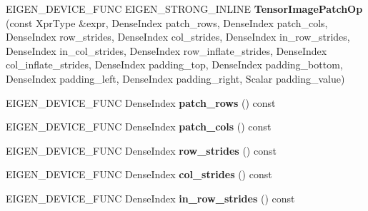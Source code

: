 \begin{DoxyCompactItemize}
\mbox{\label{class_eigen_1_1_tensor_image_patch_op_a34698ee6c72b81ae6d6f7aa7fc346c76}} 
E\+I\+G\+E\+N\+\_\+\+D\+E\+V\+I\+C\+E\+\_\+\+F\+U\+NC E\+I\+G\+E\+N\+\_\+\+S\+T\+R\+O\+N\+G\+\_\+\+I\+N\+L\+I\+NE {\bfseries Tensor\+Image\+Patch\+Op} (const Xpr\+Type \&expr, Dense\+Index patch\+\_\+rows, Dense\+Index patch\+\_\+cols, Dense\+Index row\+\_\+strides, Dense\+Index col\+\_\+strides, Dense\+Index in\+\_\+row\+\_\+strides, Dense\+Index in\+\_\+col\+\_\+strides, Dense\+Index row\+\_\+inflate\+\_\+strides, Dense\+Index col\+\_\+inflate\+\_\+strides, Dense\+Index padding\+\_\+top, Dense\+Index padding\+\_\+bottom, Dense\+Index padding\+\_\+left, Dense\+Index padding\+\_\+right, Scalar padding\+\_\+value)
\item 
\mbox{\label{class_eigen_1_1_tensor_image_patch_op_a1c91c64f0645c45a1ff9c3b4253fa1c2}} 
E\+I\+G\+E\+N\+\_\+\+D\+E\+V\+I\+C\+E\+\_\+\+F\+U\+NC Dense\+Index {\bfseries patch\+\_\+rows} () const
\item 
\mbox{\label{class_eigen_1_1_tensor_image_patch_op_a3a27f33569e00df968a5e4b36f51b57a}} 
E\+I\+G\+E\+N\+\_\+\+D\+E\+V\+I\+C\+E\+\_\+\+F\+U\+NC Dense\+Index {\bfseries patch\+\_\+cols} () const
\item 
\mbox{\label{class_eigen_1_1_tensor_image_patch_op_a802546a8dae43a44aa924bfc11e52eae}} 
E\+I\+G\+E\+N\+\_\+\+D\+E\+V\+I\+C\+E\+\_\+\+F\+U\+NC Dense\+Index {\bfseries row\+\_\+strides} () const
\item 
\mbox{\label{class_eigen_1_1_tensor_image_patch_op_a303f255d460937a50f6a62fe25df980a}} 
E\+I\+G\+E\+N\+\_\+\+D\+E\+V\+I\+C\+E\+\_\+\+F\+U\+NC Dense\+Index {\bfseries col\+\_\+strides} () const
\item 
\mbox{\label{class_eigen_1_1_tensor_image_patch_op_a1d4af257f268bf707e5726c565e5f54f}} 
E\+I\+G\+E\+N\+\_\+\+D\+E\+V\+I\+C\+E\+\_\+\+F\+U\+NC Dense\+Index {\bfseries in\+\_\+row\+\_\+strides} () const
\item 
\mbox{\label{class_eigen_1_1_tensor_image_patch_op_a29f8ede4722808727b9b6c6ebad0e3d4}} 

\end{DoxyCompactItemize}
